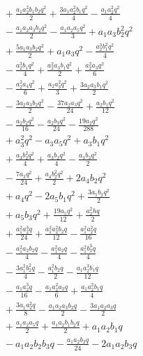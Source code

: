 \begin{align*}
&{}+ \frac{a_{1} a_{2}^{2} b_{1} b_{2} q^{2}}{2} + \frac{3 a_{1} a_{2}^{2} b_{1} q^{2}}{4} - \frac{a_{1} a_{2}^{2} q^{2}}{4}\\
&{}- \frac{a_{1} a_{2} a_{3} b_{2} q^{2}}{2} - \frac{a_{1} a_{2} a_{5} q^{2}}{3} + a_{1} a_{3} b_{2}^{2} q^{2}\\
&{}+ \frac{5 a_{1} a_{3} b_{2} q^{2}}{2} + a_{1} a_{3} q^{2} - \frac{a_{2}^{3} b_{1}^{2} q^{2}}{4}\\
&{}- \frac{a_{2}^{3} b_{1} q^{2}}{4} + \frac{a_{2}^{2} a_{3} b_{1} q^{2}}{2} + \frac{a_{2}^{2} a_{3} q^{2}}{6}\\
&{}- \frac{a_{2}^{2} a_{4} q^{2}}{6} + \frac{a_{2} a_{3}^{2} q^{2}}{3} + \frac{3 a_{2} a_{3} b_{1} q^{2}}{2}\\
&{}- \frac{3 a_{2} a_{3} b_{2} q^{2}}{2} - \frac{37 a_{2} a_{3} q^{2}}{24} + \frac{a_{2} b_{1} q^{2}}{12}\\
&{}- \frac{a_{2} b_{2} q^{2}}{16} - \frac{a_{2} b_{3} q^{2}}{24} - \frac{19 a_{2} q^{2}}{288}\\
&{}+ a_{3}^{2} q^{2} - a_{3} a_{5} q^{2} + a_{3} b_{1} q^{2}\\
&{}+ \frac{a_{3} b_{2}^{2} q^{2}}{4} + \frac{a_{3} b_{2} q^{2}}{4} - \frac{a_{3} b_{3} q^{2}}{2}\\
&{}- \frac{7 a_{3} q^{2}}{24} + \frac{a_{4} b_{2}^{2} q^{2}}{2} + 2 a_{4} b_{2} q^{2}\\
&{}+ a_{4} q^{2} - 2 a_{5} b_{1} q^{2} + \frac{3 a_{5} b_{2} q^{2}}{2}\\
&{}+ a_{5} b_{3} q^{2} + \frac{19 a_{5} q^{2}}{12} + \frac{a_{2}^{2} h q}{2}\\
&{}+ \frac{a_{1}^{2} a_{2}^{3} q}{24} + \frac{a_{1}^{2} a_{2}^{2} b_{2} q}{12} - \frac{a_{1}^{2} a_{2}^{2} q}{16}\\
&{}- \frac{a_{1}^{2} a_{2} b_{2} q}{4} - \frac{a_{1}^{2} a_{2} q}{4} - \frac{a_{1}^{2} b_{2}^{3} q}{4}\\
&{}- \frac{3 a_{1}^{2} b_{2}^{2} q}{4} - \frac{a_{1}^{2} b_{2} q}{2} - \frac{a_{1} a_{2}^{3} b_{1} q}{12}\\
&{}- \frac{a_{1} a_{2}^{3} q}{16} - \frac{a_{1} a_{2}^{2} a_{3} q}{6} + \frac{a_{1} a_{2}^{2} b_{1} q}{4}\\
&{}+ \frac{3 a_{1} a_{2}^{2} q}{8} - \frac{a_{1} a_{2} a_{3} b_{2} q}{2} - \frac{3 a_{1} a_{2} a_{3} q}{2}\\
&{}+ \frac{a_{1} a_{2} a_{5} q}{2} + \frac{a_{1} a_{2} b_{1} b_{2} q}{2} + a_{1} a_{2} b_{1} q\\
&{}- a_{1} a_{2} b_{2} b_{3} q - \frac{a_{1} a_{2} b_{2} q}{24} - 2 a_{1} a_{2} b_{3} q\\

\end{align*}
